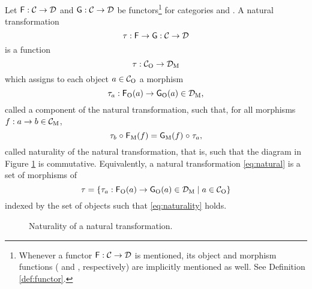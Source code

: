 \begin{definition}
  \label{def:natural}


  Let $\mathsf{F}: \mathcal{C} \to \mathcal{D}$ and $\mathsf{G}: \mathcal{C} \to
  \mathcal{D}$ be functors\footnote{Whenever a functor $\mathsf{F}: \mathcal{C}
    \to \mathcal{D}$ is mentioned, its object and morphism functions
    ( and , respectively) are implicitly mentioned
    as well. See Definition \ref{def:functor}.} for categories 
  and . A natural transformation
  \begin{equation}
    \label{eq:natural}
    \tau: \mathsf{F} \to \mathsf{G}: \mathcal{C} \to \mathcal{D}
  \end{equation}
  is a function
  \begin{equation}
    \label{eq:natural-transformation}
    \tau: \mathcal{C}_{\operatorname{O}} \to \mathcal{D}_{\operatorname{M}}
  \end{equation}
  which assigns to each object $a \in \mathcal{C}_{\operatorname{O}}$ a morphism
  \begin{equation*}
    \tau_{a}: \mathsf{F}_{\operatorname{O}}(a) \to \mathsf{G}_{\operatorname{O}}(a) \in \mathcal{D}_{\operatorname{M}}
    \text{,}
  \end{equation*}
  called a component of the natural transformation, such that, for all
  morphisms $f: a \to b \in \mathcal{C}_{\operatorname{M}}$,
  \begin{equation}
    \label{eq:naturality}
    \tau_{b} \mathrel{\circ} \mathsf{F}_{\operatorname{M}}(f) = \mathsf{G}_{\operatorname{M}}(f) \mathrel{\circ} \tau_{a}
    \text{,}
  \end{equation}
  called naturality of the natural transformation, that is, such that
  the diagram in Figure \ref{fig:naturality} is commutative.
  Equivalently, a natural transformation \eqref{eq:natural} is a set
  of morphisms of 
  \begin{equation}
    \tau = \{\tau_{a}: \mathsf{F}_{\operatorname{O}}(a) \to \mathsf{G}_{\operatorname{O}}(a) \in
    \mathcal{D}_{\operatorname{M}} \mid a \in \mathcal{C}_{\operatorname{O}}\}
  \end{equation}
  indexed by the set of objects  such that
  \eqref{eq:naturality} holds.

  \begin{figure}[htb]
    \begin{center}
    \end{center}
    \caption{Naturality of a natural transformation.}
    \label{fig:naturality}
  \end{figure}

\end{definition}

